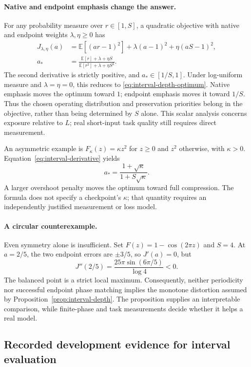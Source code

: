\paragraph{Native and endpoint emphasis change the answer.}
For any probability measure over $r\in[1,S]$, a quadratic objective with native and endpoint weights $\lambda,\eta\ge0$ has
\begin{align}
J_{\lambda,\eta}(a)&=\mathbb E[(ar-1)^2]+\lambda(a-1)^2+\eta(aS-1)^2,\\
a_*&=\frac{\mathbb E[r]+\lambda+\eta S}{\mathbb E[r^2]+\lambda+\eta S^2}.
\label{eq:weighted-depth}
\end{align}
The second derivative is strictly positive, and $a_*\in[1/S,1]$. Under log-uniform measure and $\lambda=\eta=0$, this reduces to \eqref{eq:interval-depth-optimum}. Native emphasis moves the optimum toward $1$; endpoint emphasis moves it toward $1/S$. Thus the chosen operating distribution and preservation priorities belong in the objective, rather than being determined by $S$ alone. This scalar analysis concerns exposure relative to $L$; real short-input task quality still requires direct measurement.

An asymmetric example is $F_\kappa(z)=\kappa z^2$ for $z\ge0$ and $z^2$ otherwise, with $\kappa>0$. Equation~\eqref{eq:interval-derivative} yields
\[
a_* = \frac{1+\sqrt\kappa}{1+S\sqrt\kappa}.
\]
A larger overshoot penalty moves the optimum toward full compression. The formula does not specify a checkpoint's $\kappa$; that quantity requires an independently justified measurement or loss model.

\paragraph{A circular counterexample.}
Even symmetry alone is insufficient. Set $F(z)=1-\cos(2\pi z)$ and $S=4$. At $a=2/5$, the two endpoint errors are $\pm3/5$, so $J'(a)=0$, but
\[
J''(2/5)=\frac{25\pi\sin(6\pi/5)}{\log4}<0.
\]
The balanced point is a strict local maximum. Consequently, neither periodicity nor successful endpoint phase matching implies the monotone distortion assumed by Proposition~\ref{prop:interval-depth}. The proposition supplies an interpretable comparison, while finite-phase and task measurements decide whether it helps a real model.

\subsection{Recorded development evidence for interval evaluation}
\label{sec:interval-observations}

